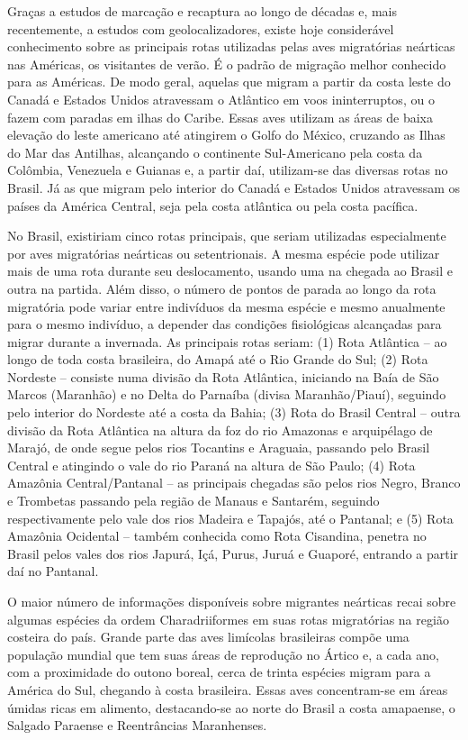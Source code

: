\documentclass[
]{scrbook}
\begin{document}
Graças a estudos de marcação e recaptura ao longo de décadas e, mais recentemente, a estudos com geolocalizadores, existe hoje considerável conhecimento sobre as principais rotas utilizadas pelas aves migratórias neárticas nas Américas, os visitantes de verão. É o padrão de migração melhor conhecido para as Américas. De modo geral, aquelas que migram a partir da costa leste do Canadá e Estados Unidos atravessam o Atlântico em voos ininterruptos, ou o fazem com paradas em ilhas do Caribe. Essas aves utilizam as áreas de baixa elevação do leste americano até atingirem o Golfo do México, cruzando as Ilhas do Mar das Antilhas, alcançando o continente Sul-Americano pela costa da Colômbia, Venezuela e Guianas e, a partir daí, utilizam-se das diversas rotas no Brasil. Já as que migram pelo interior do Canadá e Estados Unidos atravessam os países da América Central, seja pela costa atlântica ou pela costa pacífica.

No Brasil, existiriam cinco rotas principais, que seriam utilizadas especialmente por aves migratórias neárticas ou setentrionais. A mesma espécie pode utilizar mais de uma rota durante seu deslocamento, usando uma na chegada ao Brasil e outra na partida. Além disso, o número de pontos de parada ao longo da rota migratória pode variar entre indivíduos da mesma espécie e mesmo anualmente para o mesmo indivíduo, a depender das condições fisiológicas alcançadas para migrar durante a invernada. As principais rotas seriam: (1) Rota Atlântica -- ao longo de toda costa brasileira, do Amapá até o Rio Grande do Sul; (2) Rota Nordeste -- consiste numa divisão da Rota Atlântica, iniciando na Baía de São Marcos (Maranhão) e no Delta do Parnaíba (divisa Maranhão/Piauí), seguindo pelo interior do Nordeste até a costa da Bahia; (3) Rota do Brasil Central -- outra divisão da Rota Atlântica na altura da foz do rio Amazonas e arquipélago de Marajó, de onde segue pelos rios Tocantins e Araguaia, passando pelo Brasil Central e atingindo o vale do rio Paraná na altura de São Paulo; (4) Rota Amazônia Central/Pantanal -- as principais chegadas são pelos rios Negro, Branco e Trombetas passando pela região de Manaus e Santarém, seguindo respectivamente pelo vale dos rios Madeira e Tapajós, até o Pantanal; e (5) Rota Amazônia Ocidental -- também conhecida como Rota Cisandina, penetra no Brasil pelos vales dos rios Japurá, Içá, Purus, Juruá e Guaporé, entrando a partir daí no Pantanal.

O maior número de informações disponíveis sobre migrantes neárticas recai sobre algumas espécies da ordem Charadriiformes em suas rotas migratórias na região costeira do país. Grande parte das aves limícolas brasileiras compõe uma população mundial que tem suas áreas de reprodução no Ártico e, a cada ano, com a proximidade do outono boreal, cerca de trinta espécies migram para a América do Sul, chegando à costa brasileira. Essas aves concentram-se em áreas úmidas ricas em alimento, destacando-se ao norte do Brasil a costa amapaense, o Salgado Paraense e Reentrâncias Maranhenses.
\end{document}
